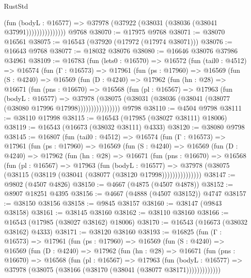 \begin{lexlean}{RustStd}
\begin{coremodule}
                        (fun (bodyL : @16577) =>
                        @37978 (@37922 (@38031 (@38036 (@38041 @37991)))))))))))))))
    @9768
@38070 := @17975 @9768
@38071 := @38070 @16561
@38075 := @16543 (@37920 (@17972 (@17974 @38071)))
@38076 := @16643 @9768
@38077 := @18032 @38076
@38080 := @16646 @38076 @37986 @34961
@38109 := @16783
    (fun (lets0 : @16570) =>
    @16572
      (fun (tail0 : @4512) =>
      @16574
        (fun (Γ : @16573) =>
        @17961
          (fun (ps : @17960) =>
          @16569
            (fun (S : @4240) =>
            @16569
              (fun (D : @4240) =>
              @17962
                (fun (hn : @28) =>
                @16671
                  (fun (pns : @16670) =>
                  @16568
                    (fun (pl : @16567) =>
                    @17963
                      (fun (bodyL : @16577) =>
                      @37978
                        (@38075
                          (@38031 (@38036 (@38041 (@38077 (@38080 @17996 @17998))))))))))))))))
    @9798
@38110 := @4504 @9798
@38111 := @38110 @17998
@38115 := @16543 (@17985 (@38027 @38111) @18006)
@38119 := @16543 (@16673 (@38032 @38111) @4333)
@38120 := @38080 @9798
@38145 := @16807
    (fun (tail0 : @4512) =>
    @16574
      (fun (Γ : @16573) =>
      @17961
        (fun (ps : @17960) =>
        @16569
          (fun (S : @4240) =>
          @16569
            (fun (D : @4240) =>
            @17962
              (fun (hn : @28) =>
              @16671
                (fun (pns : @16670) =>
                @16568
                  (fun (pl : @16567) =>
                  @17963
                    (fun (bodyL : @16577) =>
                    @37978 (@38075 (@38115 (@38119 (@38041 (@38077 (@38120 @17998)))))))))))))))
@38147 := @9802 (@4507 @4826)
@38150 := @4667 (@4875 (@4507 @4878))
@38152 := @8907 @18251 @4395
@38156 := @4667 (@4888 (@4507 @38152)) @4747
@38157 := @38150 @38156
@38158 := @9845 @38157
@38160 := @38147 (@9843 @38158)
@38161 := @38145 @38160
@38162 := @38110 @38160
@38166 := @16543 (@17985 (@38027 @38162) @18006)
@38170 := @16543 (@16673 (@38032 @38162) @4333)
@38171 := @38120 @38160
@38193 := @16825
    (fun (Γ : @16573) =>
    @17961
      (fun (ps : @17960) =>
      @16569
        (fun (S : @4240) =>
        @16569
          (fun (D : @4240) =>
          @17962
            (fun (hn : @28) =>
            @16671
              (fun (pns : @16670) =>
              @16568
                (fun (pl : @16567) =>
                @17963
                  (fun (bodyL : @16577) =>
                  @37978 (@38075 (@38166 (@38170 (@38041 (@38077 @38171)))))))))))))

\end{coremodule}
\end{lexlean}
